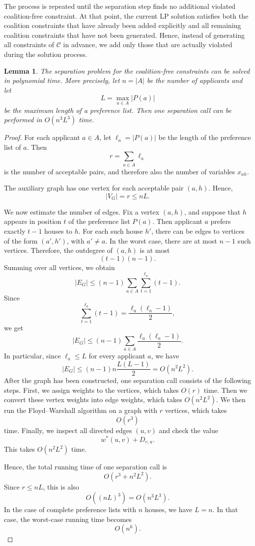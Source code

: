\documentclass[12pt]{report}
\newtheorem{llemma}[base]{Lemma}
\numberwithin{algorithm}{chapter}
\begin{document}
	The process is repeated until the separation step finds no additional violated coalition-free constraint. At that point, the current LP solution satisfies both the coalition constraints that have already been added explicitly and all remaining coalition constraints that have not been generated. Hence, instead of generating all constraints of $\mathcal C$ in advance, we add only those that are actually violated during the solution process.

	\begin{llemma}
		The separation problem for the coalition-free constraints can be solved in polynomial time. More precisely, let $n=|A|$ be the number of applicants and let
		\[
		L=\max_{a\in A}|P(a)|
		\]
		be the maximum length of a preference list. Then one separation call can be performed in $O(n^3L^3)$ time.
	\end{llemma}
	
	\begin{proof}
		For each applicant $a\in A$, let $\ell_a=|P(a)|$ be the length of the preference list of $a$.
		Then
		\[
		r=\sum_{a\in A}\ell_a
		\]
		is the number of acceptable pairs, and therefore also the number of variables $x_{ah}$.
		
		The auxiliary graph has one vertex for each acceptable pair $(a,h)$. Hence,
		\[
		|V_G|=r\leq nL.
		\]
		
		We now estimate the number of edges. Fix a vertex $(a,h)$, and suppose that
		$h$ appears in position $t$ of the preference list $P(a)$. Then applicant $a$
		prefers exactly $t-1$ houses to $h$. For each such house $h'$, there can be
		edges to vertices of the form $(a',h')$, with $a'\neq a$. In the worst case,
		there are at most $n-1$ such vertices. Therefore, the outdegree of $(a,h)$ is
		at most
		\[
		(t-1)(n-1).
		\]
		Summing over all vertices, we obtain
		\[
		|E_G|
		\leq
		(n-1)\sum_{a\in A}\sum_{t=1}^{\ell_a}(t-1).
		\]
		Since
		\[
		\sum_{t=1}^{\ell_a}(t-1)
		=
		\frac{\ell_a(\ell_a-1)}{2},
		\]
		we get
		\[
		|E_G|
		\leq
		(n-1)\sum_{a\in A}\frac{\ell_a(\ell_a-1)}{2}.
		\]
		In particular, since $\ell_a\leq L$ for every applicant $a$, we have
		\[
		|E_G|
		\leq
		(n-1)n\frac{L(L-1)}{2}
		=
		O(n^2L^2).
		\]
		After the graph has been constructed, one separation call consists of the
		following steps. First, we assign weights to the vertices, which takes $O(r)$
		time. Then we convert these vertex weights into edge weights, which takes $O(n^2L^2)$. We then run the Floyd--Warshall algorithm on a graph with
		$r$ vertices, which takes
		\[
		O(r^3)
		\]
		time. Finally, we inspect all directed edges $(u,v)$ and check the value
		\[
		w^*(u,v)+D_{v,u}.
		\]
		This takes $O(n^2L^2)$ time.
		
		Hence, the total running time of one separation call is
		\[
		O(r^3+n^2L^2).
		\]
		Since $r\leq nL$, this is also
		\[
		O((nL)^3)=O(n^3L^3).
		\]
		In the case of complete preference lists with $n$ houses, we have $L=n$. In that case, the worst-case running time becomes
		\[
		O(n^6).
		\]
	\end{proof}
	
\end{document}
